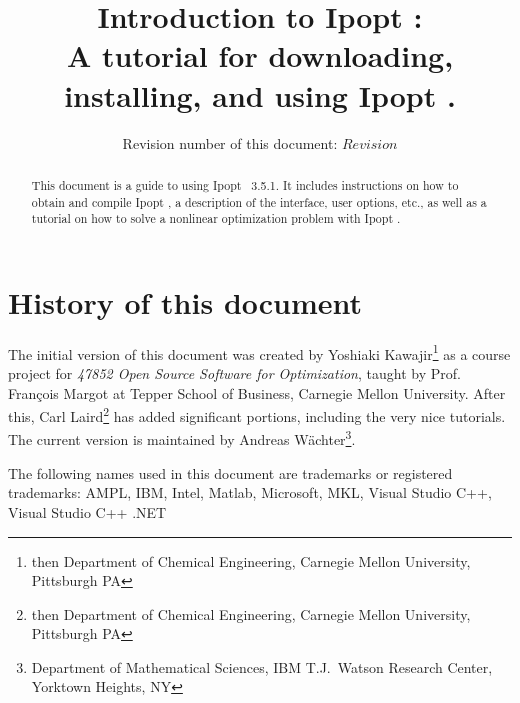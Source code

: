 \documentclass[10pt]{article}
\newcommand{\Ipopt}{{\sc Ipopt }}
\begin{document}
\title{Introduction to \Ipopt:\\
A tutorial for downloading, installing, and using \Ipopt.}

\author{Revision number of this document: $Revision$}

\maketitle

\begin{abstract}
  This document is a guide to using \Ipopt\ 3.5.1.  It includes
  instructions on how to obtain and compile \Ipopt, a description of
  the interface, user options, etc., as well as a tutorial on how to
  solve a nonlinear optimization problem with \Ipopt.
\end{abstract}

\section*{History of this document}
The initial version of this document was created by Yoshiaki
Kawajir\footnote{then Department of Chemical Engineering, Carnegie Mellon
  University, Pittsburgh PA} as a course project for \textit{47852
  Open Source Software for Optimization}, taught by Prof. Fran\c cois
Margot at Tepper School of Business, Carnegie Mellon University.
After this, Carl Laird\footnote{then Department of Chemical
  Engineering, Carnegie Mellon University, Pittsburgh PA} has added
significant portions, including the very nice tutorials.  The current
version is maintained by Andreas W\"achter\footnote{Department of
  Mathematical Sciences, IBM T.J.\ Watson Research Center, Yorktown
  Heights, NY}.

\tableofcontents

\vspace{\baselineskip}
\begin{small}
\noindent
The following names used in this document are trademarks or registered
trademarks: AMPL, IBM, Intel, Matlab, Microsoft, MKL, Visual Studio C++,
Visual Studio C++ .NET
\end{small}
\end{document}
